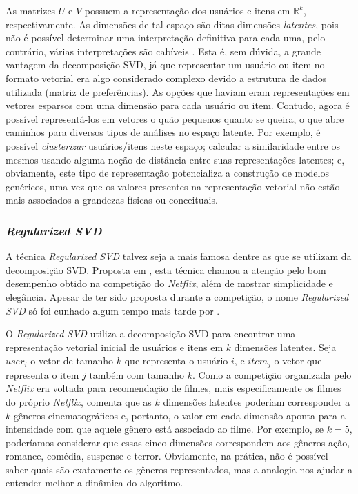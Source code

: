 As matrizes $U$ e $V$ possuem a representação dos usuários e itens em $\mathbb{R}^k$, respectivamente. As dimensões de tal espaço são ditas dimensões \textit{latentes}, pois não é possível determinar uma interpretação definitiva para cada uma, pelo contrário, várias interpretações são cabíveis \citep{Dumais:LSA:2004}. Esta é, sem dúvida, a grande vantagem da decomposição SVD, já que representar um usuário ou item no formato vetorial era algo considerado complexo devido a estrutura de dados utilizada (matriz de preferências). As opções que haviam eram representações em vetores esparsos com uma dimensão para cada usuário ou item. Contudo, agora é possível representá-los em vetores o quão pequenos quanto se queira, o que abre caminhos para diversos tipos de análises no espaço latente. Por exemplo, é possível \textit{clusterizar} usuários/itens neste espaço; calcular a similaridade entre os mesmos usando alguma noção de distância entre suas representações latentes; e, obviamente, este tipo de representação potencializa a construção de modelos genéricos, uma vez que os valores presentes na representação vetorial não estão mais associados a grandezas físicas ou conceituais. 

\subsubsection{\textit{Regularized SVD}}
\label{sec:regularized-svd}
A técnica \textit{Regularized SVD} talvez seja a mais famosa dentre as que se utilizam da decomposição SVD. Proposta em \citep{Funk:2006:Online}, esta técnica chamou a atenção pelo bom desempenho obtido na competição do \textit{Netflix}, além de mostrar simplicidade e elegância. Apesar de ter sido proposta durante a competição, o nome \textit{Regularized SVD} só foi cunhado algum tempo mais tarde por \citep{paterek_2007}.

O \textit{Regularized SVD} utiliza a decomposição SVD para encontrar uma representação vetorial inicial de usuários e itens em $k$ dimensões latentes. Seja $user_i$ o vetor de tamanho $k$ que representa o usuário $i$, e $item_j$ o vetor que representa o item $j$ também com tamanho $k$. Como a competição organizada pelo \textit{Netflix} era voltada para recomendação de filmes, mais especificamente os filmes do próprio \textit{Netflix}, \citep{Funk:2006:Online} comenta que as $k$ dimensões latentes poderiam corresponder a $k$ gêneros cinematográficos e, portanto, o valor em cada dimensão aponta para a intensidade com que aquele gênero está associado ao filme. Por exemplo, se $k=5$, poderíamos considerar que essas cinco dimensões correspondem aos gêneros ação, romance, comédia, suspense e terror. Obviamente, na prática, não é possível saber quais são exatamente os gêneros representados, mas a analogia nos ajudar a entender melhor a dinâmica do algoritmo.

